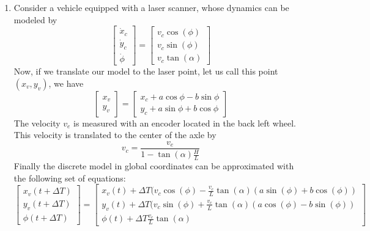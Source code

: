 \documentclass{article}
\begin{document}
\begin{enumerate}
\begin{enumerate}
          \end{enumerate} 
\item Consider a vehicle equipped with a laser scanner, whose dynamics can be modeled by 
\begin{equation}
  \begin{bmatrix}
  \dot{x}_c \\ \dot{y}_c \\ \dot{\phi} 
  \end{bmatrix}
  =
   \begin{bmatrix}
  v_c \cos(\phi) \\ v_c \sin(\phi) \\ v_c \tan(\alpha) 
  \end{bmatrix}
\end{equation}
Now, if we translate our model to the laser point, let us call this point $(x_v,y_v)$,
we have
\begin{equation}
     \begin{bmatrix}
x_v \\ y_v
  \end{bmatrix}
  =
  \begin{bmatrix}
x_c + a \cos \phi - b \sin \phi \\
y_c + a \sin \phi + b \cos \phi 
  \end{bmatrix}
\end{equation}
The velocity $v_e$ is measured with an encoder located in the back left wheel.
This velocity is translated to the center of the axle by
\begin{equation}
v_c = \dfrac{v_e}{1-\tan(\alpha) \frac{H}{L} }    
\end{equation}
Finally the discrete model in global coordinates can be approximated with the following set of equations:
\begin{equation}
\begin{bmatrix}
x_v(t+\Delta T)    \\
y_v(t+\Delta T)   \\
\phi(t+\Delta T)
\end{bmatrix}
=
\begin{bmatrix}
x_v(t) + \Delta T (v_c \cos(\phi) - \frac{v_c}{L} \tan(\alpha)(a \sin(\phi)+b \cos(\phi)) \\   
y_v(t) + \Delta T (v_c \sin(\phi) + \frac{v_c}{L} \tan(\alpha)(a \cos(\phi)- b \sin(\phi)) \\
\phi(t) + \Delta T \frac{v_c}{L} \tan(\alpha)
\end{bmatrix}
\end{equation}
\begin{figure}[H]

\end{figure}
\end{enumerate}
\end{document}
